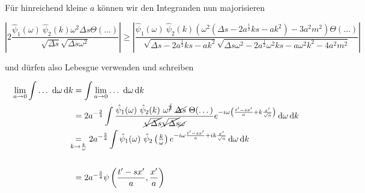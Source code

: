 Für hinreichend kleine $a$ können wir den Integranden nun majorisieren

\begin{dmath*}
    \left|
    2 \frac{
        \hat\psi_1(\omega) ~\hat\psi_2(k) \omega^2 \Delta s \Theta(\dots)}
    {
        \sqrt{\Delta s} \sqrt{\Delta s \omega^2}
    }
    \right|
    \geq
    \left|
    \frac{
        \hat\psi_1(\omega)~ \hat\psi_2(k) \left(
        \omega^2 \left(\Delta s - 2 a^{\frac{1}{2}} k s - ak^2
                \right) - 3a^2m^2
        \right)
         \Theta(\dots)
     }
     {
        \sqrt{\Delta s -2a^{\frac{1}{2}}ks - ak^2}
            \sqrt{\Delta s \omega^2 -2a^{\frac{1}{2}} \omega^2 k s
                    - a\omega^2k^2-4 a^2 m^2}
     }
    \right|
\end{dmath*}

und dürfen also Lebesgue verwenden und schreiben

\begin{align*}
    \lim_{a \rightarrow 0} \int \dots ~\d \omega \d k
    &=
    \int \lim_{a \rightarrow 0} \dots ~\d \omega \d k
    \\ &=
    2 a^{-\frac{3}{4}} \int
    \frac{\hat\psi_1(\omega) ~\hat\psi_2(k) ~\omega^{\cancel{2}}
        ~\cancel{\Delta s} ~\Theta(\dots)
    }
    {
        \cancel{\sqrt{\Delta s}}\cancel{\sqrt{\Delta s}}\cancel{\omega}
    }
    e^{-i \omega \left(\frac{t'-sx'}{a} + k \frac{x'}{\sqrt{a}}\right)}
    \d \omega \d k
    \\ & \kern -.6em\underset{k\rightarrow \frac{k}{\omega}}{=}
    2 a^{-\frac{3}{4}} \int
    \hat\psi_1(\omega) ~\hat\psi_2\left(\tfrac{k}{\omega}\right)
    e^{-i\omega \frac{t'-sx'}{a} + ik \frac{x'}{\sqrt{a}}}
    \d \omega \d k \\
    \\ &=
    2 a^{-\frac{3}{4}} \psi \left(\frac{t'-sx'}{a}, \frac{x'}{a}\right)
\end{align*}


